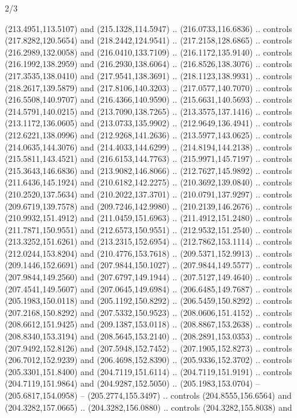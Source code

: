 \begin{flagdescription}{2/3}
\begin{scope}[xshift=0.5\flaglength,yshift=0.5\flagwidth,scale=\flagwidth/180]
\begin{scope}[y=0.8pt, x=0.8pt, yscale=-1,shift={(-168.75,-108.75)}]
  (213.4951,113.5107) and (215.1328,114.5947) .. (216.0733,116.6836) .. controls
  (217.8282,120.5654) and (218.2442,124.9541) .. (217.2158,128.6865) .. controls
  (216.2989,132.0058) and (216.0410,133.7109) .. (216.1172,135.9140) .. controls
  (216.1992,138.2959) and (216.2930,138.6064) .. (216.8526,138.3076) .. controls
  (217.3535,138.0410) and (217.9541,138.3691) .. (218.1123,138.9931) .. controls
  (218.2617,139.5879) and (217.8106,140.3203) .. (217.0577,140.7070) .. controls
  (216.5508,140.9707) and (216.4366,140.9590) .. (215.6631,140.5693) .. controls
  (214.5791,140.0215) and (213.7090,138.7265) .. (213.3575,137.1416) .. controls
  (213.1172,136.0605) and (213.0733,135.9902) .. (212.9649,136.4941) .. controls
  (212.6221,138.0996) and (212.9268,141.2636) .. (213.5977,143.0625) .. controls
  (214.0635,144.3076) and (214.4033,144.6299) .. (214.8194,144.2138) .. controls
  (215.5811,143.4521) and (216.6153,144.7763) .. (215.9971,145.7197) .. controls
  (215.3643,146.6836) and (213.9082,146.8066) .. (212.7627,145.9892) .. controls
  (211.6436,145.1924) and (210.6182,142.2275) .. (210.3692,139.0840) .. controls
  (210.2520,137.5634) and (210.2022,137.3701) .. (210.0791,137.9297) .. controls
  (209.6719,139.7578) and (209.7246,142.9980) .. (210.2139,146.2676) .. controls
  (210.9932,151.4912) and (211.0459,151.6963) .. (211.4912,151.2480) .. controls
  (211.7871,150.9551) and (212.6573,150.9551) .. (212.9532,151.2540) .. controls
  (213.3252,151.6261) and (213.2315,152.6954) .. (212.7862,153.1114) .. controls
  (212.0244,153.8204) and (210.4776,153.7618) .. (209.5371,152.9913) .. controls
  (209.1446,152.6691) and (207.9844,150.1027) .. (207.9844,149.5577) .. controls
  (207.9844,149.2560) and (207.6797,149.1944) .. (207.5127,149.4640) .. controls
  (207.4541,149.5607) and (207.0645,149.6984) .. (206.6485,149.7687) .. controls
  (205.1983,150.0118) and (205.1192,150.8292) .. (206.5459,150.8292) .. controls
  (207.2168,150.8292) and (207.5332,150.9523) .. (208.0606,151.4152) .. controls
  (208.6612,151.9425) and (209.1387,153.0118) .. (208.8867,153.2638) .. controls
  (208.8340,153.3194) and (208.5645,153.2140) .. (208.2891,153.0353) .. controls
  (207.9492,152.8126) and (207.5948,152.7452) .. (207.1905,152.8273) .. controls
  (206.7012,152.9239) and (206.4698,152.8390) .. (205.9336,152.3702) .. controls
  (205.3301,151.8400) and (204.7119,151.6114) .. (204.7119,151.9191) .. controls
  (204.7119,151.9864) and (204.9287,152.5050) .. (205.1983,153.0704) --
  (205.6817,154.0958) -- (205.2774,155.3497) .. controls (204.8555,156.6564) and
  (204.3282,157.0665) .. (204.3282,156.0880) .. controls (204.3282,155.8038) and

\end{scope}
\end{scope}
\end{flagdescription}
